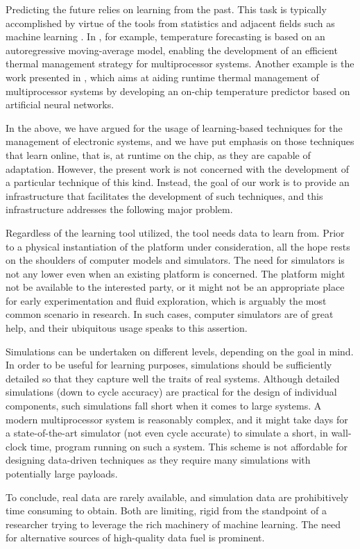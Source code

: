 Predicting the future relies on learning from the past. This task is typically
accomplished by virtue of the tools from statistics and adjacent fields such as
machine learning \cite{bishop2006}. In \cite{coskun2008}, for example,
temperature forecasting is based on an autoregressive moving-average model,
enabling the development of an efficient thermal management strategy for
multiprocessor systems. Another example is the work presented in
\cite{kumar2010}, which aims at aiding runtime thermal management of
multiprocessor systems by developing an on-chip temperature predictor based on
artificial neural networks.


In the above, we have argued for the usage of learning-based techniques for the
management of electronic systems, and we have put emphasis on those techniques
that learn online, that is, at runtime on the chip, as they are capable of
adaptation. However, the present work is not concerned with the development of a
particular technique of this kind. Instead, the goal of our work is to provide
an infrastructure that facilitates the development of such techniques, and this
infrastructure addresses the following major problem.

Regardless of the learning tool utilized, the tool needs data to learn from.
Prior to a physical instantiation of the platform under consideration, all the
hope rests on the shoulders of computer models and simulators. The need for
simulators is not any lower even when an existing platform is concerned. The
platform might not be available to the interested party, or it might not be an
appropriate place for early experimentation and fluid exploration, which is
arguably the most common scenario in research. In such cases, computer
simulators are of great help, and their ubiquitous usage speaks to this
assertion.

Simulations can be undertaken on different levels, depending on the goal in
mind. In order to be useful for learning purposes, simulations should be
sufficiently detailed so that they capture well the traits of real systems.
Although detailed simulations (down to cycle accuracy) are practical for the
design of individual components, such simulations fall short when it comes to
large systems. A modern multiprocessor system is reasonably complex, and it
might take days for a state-of-the-art simulator (not even cycle accurate) to
simulate a short, in wall-clock time, program running on such a system. This
scheme is not affordable for designing data-driven techniques as they require
many simulations with potentially large payloads.

To conclude, real data are rarely available, and simulation data are
prohibitively time consuming to obtain. Both are limiting, rigid from the
standpoint of a researcher trying to leverage the rich machinery of machine
learning. The need for alternative sources of high-quality data fuel is
prominent.
